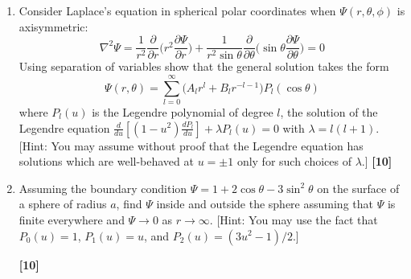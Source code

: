 \documentclass[a4paper]{article}
\begin{document}
\newpage
\begin{qns}\leavevmode
\begin{enumerate}[label=(\alph*)]
\item Consider Laplace’s equation in spherical polar coordinates when $\Psi(r,\theta,\phi)$ is axisymmetric:
$$\nabla^2\Psi=\frac{1}{r^2}\frac{\partial}{\partial r}\bigg(r^2\frac{\partial\Psi}{\partial r}\bigg)+\frac{1}{r^2\sin\theta}\frac{\partial}{\partial\theta}\bigg(\sin\theta\frac{\partial\Psi}{\partial\theta}\bigg)=0$$
Using separation of variables show that the general solution takes the form
$$\Psi(r,\theta)=\sum_{l=0}^\infty\bigg(A_lr^l+B_lr^{-l-1}\bigg)P_l(\cos\theta)$$
where $P_l(u)$ is the Legendre polynomial of degree $l$, the solution of the Legendre equation
$\frac{d}{du}[(1-u^2)\frac{dP_l}{du}]+\lambda P_l(u)=0$ with $\lambda=l(l+1)$. [Hint: You may assume without proof that the Legendre equation has solutions which are well-behaved at $u=\pm1$ only for such choices of $\lambda$.] \hfill\textbf{[10]}
\item Assuming the boundary condition $\Psi=1+2\cos\theta-3\sin^2\theta$ on the surface
of a sphere of radius $a$, find $\Psi$ inside and outside the sphere assuming that $\Psi$ is finite
everywhere and $\Psi\rightarrow 0$ as $r\rightarrow\infty$. [Hint: You may use the fact that $P_0(u) = 1$, $P_1(u) = u$, and $P_2(u) = (3u^2 − 1)/2$.]

\hfill\textbf{[10]}
\end{enumerate}
\end{qns}
\end{document}
